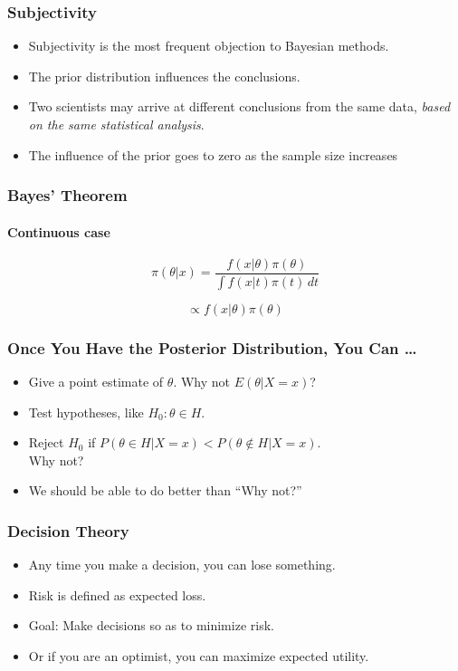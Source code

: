 \documentclass[12pt]{beamer}
\begin{document}
\begin{frame}
	\frametitle{Subjectivity}
	
	\begin{itemize}[label={\color{blue}$\blacktriangleright$}]
		\item Subjectivity is the most frequent objection to Bayesian methods.
		
		\item The prior distribution influences the conclusions.
		
		\item Two scientists may arrive at different conclusions from the same data, \textit{based on the same statistical analysis}.
		
		\item The influence of the prior goes to zero as the sample size increases
		
	\end{itemize}
	
\end{frame}
\begin{frame}
	\frametitle{Bayes' Theorem}
	\framesubtitle{Continuous case}
	
	\[
	\pi(\theta|x) = \frac{f(x|\theta)\pi(\theta)}{\int f(x|t)\pi(t)\,dt}
	\]
	
	
	\[
	\propto f(x|\theta)\pi(\theta)
	\]
	
\end{frame}
\begin{frame}
	\frametitle{Once You Have the Posterior Distribution, You Can \ldots}
	
	\begin{itemize}[label={\color{blue}$\blacktriangleright$}]
		\item Give a point estimate of $\theta$. Why not $E(\theta|X = x)$?
		
		\item Test hypotheses, like $H_0 : \theta \in H$.
		
		\item Reject $H_0$ if $P(\theta \in H|X = x) < P(\theta \notin H|X = x)$. \\ Why not?
		
		\item We should be able to do better than ``Why not?''
	\end{itemize}
	
\end{frame}
\begin{frame}
	\frametitle{Decision Theory}
	
	\begin{itemize}[label={\color{blue}$\blacktriangleright$}]
		\item Any time you make a decision, you can lose something.
		
		\item Risk is defined as expected loss.
		
		\item Goal: Make decisions so as to minimize risk.
		
		\item Or if you are an optimist, you can maximize expected utility.
	\end{itemize}
	
\end{frame}
\end{document}

